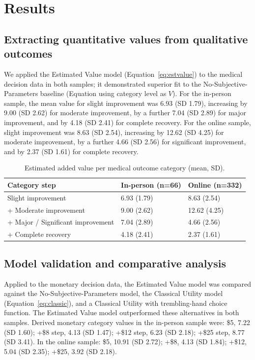 \documentclass[11pt]{article}
\begin{document}
\section{Results}
\subsection{Extracting quantitative values from qualitative outcomes}
We applied the Estimated Value model (Equation~\ref{eq:estvalue}) to the medical decision data in both samples; it demonstrated superior fit to the No-Subjective-Parameters baseline (Equation using category level as $V$). For the in-person sample, the mean value for slight improvement was 6.93 (SD 1.79), increasing by 9.00 (SD 2.62) for moderate improvement, by a further 7.04 (SD 2.89) for major improvement, and by 4.18 (SD 2.41) for complete recovery. For the online sample, slight improvement was 8.63 (SD 2.54), increasing by 12.62 (SD 4.25) for moderate improvement, by a further 4.66 (SD 2.56) for significant improvement, and by 2.37 (SD 1.61) for complete recovery.

\begin{table}[h]
\centering
\caption{Estimated added value per medical outcome category (mean, SD).}
\begin{tabular}{lll}
\toprule
Category step & In-person (n=66) & Online (n=332) \\
\midrule
Slight improvement & 6.93 (1.79) & 8.63 (2.54) \\
+ Moderate improvement & 9.00 (2.62) & 12.62 (4.25) \\
+ Major / Significant improvement & 7.04 (2.89) & 4.66 (2.56) \\
+ Complete recovery & 4.18 (2.41) & 2.37 (1.61) \\
\bottomrule
\end{tabular}
\end{table}

\subsection{Model validation and comparative analysis}
Applied to the monetary decision data, the Estimated Value model was compared against the No-Subjective-Parameters model, the Classical Utility model (Equation~\ref{eq:classic}), and a Classical Utility with trembling-hand choice function. The Estimated Value model outperformed these alternatives in both samples. Derived monetary category values in the in-person sample were: \$5, 7.22 (SD 1.60); +\$8 step, 4.13 (SD 1.47); +\$12 step, 6.23 (SD 2.18); +\$25 step, 8.77 (SD 3.41). In the online sample: \$5, 10.91 (SD 2.72); +\$8, 4.13 (SD 1.84); +\$12, 5.04 (SD 2.35); +\$25, 3.92 (SD 2.18).
\end{document}
